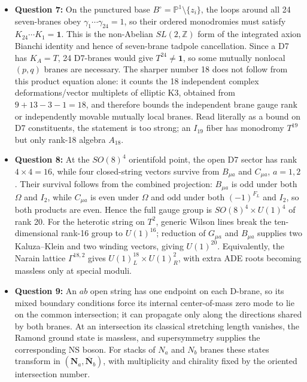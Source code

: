 \documentclass[
  10pt,
  a4paper,
  openany]{book}
\begin{document}
\begin{itemize}
\item
  \textbf{Question 7:} On the punctured base
  \(B^\circ=\mathbb P^1\setminus\{z_i\}\), the loops around all 24
  seven-branes obey \(\gamma_1\cdots\gamma_{24}=1\), so their ordered
  monodromies must satisfy \(K_{24}\cdots K_1=\mathbf1\). This is the
  non-Abelian \(SL(2,\mathbb Z)\) form of the integrated axion Bianchi
  identity and hence of seven-brane tadpole cancellation. Since a D7 has
  \(K_A=T\), 24 D7-branes would give \(T^{24}\neq\mathbf1\), so some
  mutually nonlocal \((p,q)\) branes are necessary. The sharper number
  18 does not follow from this product equation alone: it counts the 18
  independent complex deformations/vector multiplets of elliptic K3,
  obtained from \(9+13-3-1=18\), and therefore bounds the independent
  brane gauge rank or independently movable mutually local branes. Read
  literally as a bound on D7 constituents, the statement is too strong;
  an \(I_{19}\) fiber has monodromy \(T^{19}\) but only rank-18 algebra
  \(A_{18}\).
\item
  \textbf{Question 8:} At the \(SO(8)^4\) orientifold point, the open D7
  sector has rank \(4\times4=16\), while four closed-string vectors
  survive from \(B_{\mu a}\) and \(C_{\mu a}\), \(a=1,2\). Their
  survival follows from the combined projection: \(B_{\mu a}\) is odd
  under both \(\Omega\) and \(I_2\), while \(C_{\mu a}\) is even under
  \(\Omega\) and odd under both \((-1)^{F_L}\) and \(I_2\), so both
  products are even. Hence the full gauge group is
  \(SO(8)^4\times U(1)^4\) of rank 20. For the heterotic string on
  \(T^2\), generic Wilson lines break the ten-dimensional rank-16 group
  to \(U(1)^{16}\); reduction of \(G_{\mu a}\) and \(B_{\mu a}\)
  supplies two Kaluza--Klein and two winding vectors, giving
  \(U(1)^{20}\). Equivalently, the Narain lattice \(\Gamma^{18,2}\)
  gives \(U(1)^{18}_L\times U(1)^2_R\), with extra ADE roots becoming
  massless only at special moduli.
\item
  \textbf{Question 9:} An \(ab\) open string has one endpoint on each
  D-brane, so its mixed boundary conditions force its internal
  center-of-mass zero mode to lie on the common intersection; it can
  propagate only along the directions shared by both branes. At an
  intersection its classical stretching length vanishes, the Ramond
  ground state is massless, and supersymmetry supplies the corresponding
  NS boson. For stacks of \(N_a\) and \(N_b\) branes these states
  transform in \((\mathbf N_a,\overline{\mathbf N}_b)\), with
  multiplicity and chirality fixed by the oriented intersection number.

\end{itemize}
\end{document}
